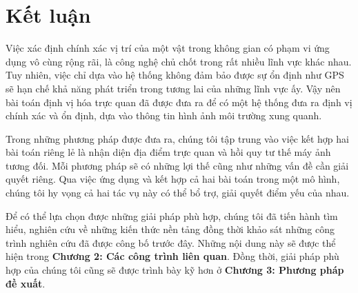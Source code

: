 \section{Kết luận}
Việc xác định chính xác vị trí của một vật trong không gian có phạm vi ứng dụng vô cùng rộng rãi, là công nghệ chủ chốt trong rất nhiều lĩnh vực khác nhau. Tuy nhiên, việc chỉ dựa vào hệ thống không đảm bảo được sự ổn định như GPS sẽ hạn chế khả năng phát triển trong tương lai của những lĩnh vực ấy. Vậy nên bài toán định vị hóa trực quan đã được đưa ra để có một hệ thống đưa ra định vị chính xác và ổn định, dựa vào thông tin hình ảnh môi trường xung quanh.

Trong những phương pháp được đưa ra, chúng tôi tập trung vào việc kết hợp hai bài toán riêng lẻ là nhận diện địa điểm trực quan và hồi quy tư thế máy ảnh tương đối. Mỗi phương pháp sẽ có những lợi thế cũng như những vấn đề cần giải quyết riêng. Qua việc ứng dụng và kết hợp cả hai bài toán trong một mô hình, chúng tôi hy vọng cả hai tác vụ này có thể bổ trợ, giải quyết điểm yếu của nhau.

Để có thể lựa chọn được những giải pháp phù hợp, chúng tôi đã tiến hành tìm hiểu, nghiên cứu về những kiến thức nền tảng đồng thời khảo sát những công trình nghiên cứu đã được công bố trước đây. Những nội dung này sẽ được thể hiện trong \textbf{Chương 2: Các công trình liên quan}. Đồng thời, giải pháp phù hợp của chúng tôi cũng sẽ được trình bày kỹ hơn ở \textbf{Chương 3: Phương pháp đề xuất}.

